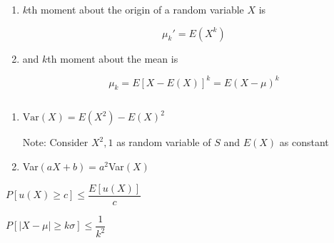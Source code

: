 
\begin{enumerate}[wide,label = $\bullet$]
	\item $k$th moment about the origin of a random variable $X$ is 
	
	$$\mu_k' = E(X^k)$$
	\item and $k$th moment about the mean is
	
	$$\mu_k = E[X - E(X)]^k = E(X - \mu)^k$$
\end{enumerate}

\begin{thm*}$ $
	\begin{enumerate}[wide,label = $\bullet$]
		\item $\text{Var}(X) = E(X^2) - E(X)^2$
		
		Note: Consider $X^2,1$ as random variable of $S$ and $E(X)$ as constant
		
		\item Var$(aX + b) = a^2$Var$(X)$
	\end{enumerate}
\end{thm*}

\begin{thm*}
	$P[u(X) \geq c] \leq \dfrac{E[u(X)]}{c}$
\end{thm*}

\begin{thm*}
	$P[|X - \mu| \geq k\sigma] \leq \dfrac{1}{k^2}$
\end{thm*}






















